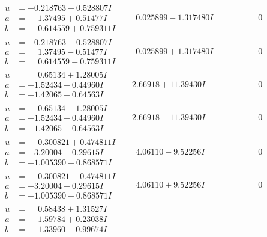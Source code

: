 \documentclass[1p]{elsarticle_modified}
\theoremstyle{definition}
\begin{document}
$$\begin{array}{c|c|c}
\begin{aligned}
u &= -0.218763 + 0.528807 I \\
a &= \phantom{-}1.37495 + 0.51477 I \\
b &= \phantom{-}0.614559 + 0.759311 I\end{aligned}
 & \phantom{-}0.025899 - 1.317480 I & \phantom{-0.000000 } 0 \\ \hline\begin{aligned}
u &= -0.218763 - 0.528807 I \\
a &= \phantom{-}1.37495 - 0.51477 I \\
b &= \phantom{-}0.614559 - 0.759311 I\end{aligned}
 & \phantom{-}0.025899 + 1.317480 I & \phantom{-0.000000 } 0 \\ \hline\begin{aligned}
u &= \phantom{-}0.65134 + 1.28005 I \\
a &= -1.52434 - 0.44960 I \\
b &= -1.42065 + 0.64563 I\end{aligned}
 & -2.66918 + 11.39430 I & \phantom{-0.000000 } 0 \\ \hline\begin{aligned}
u &= \phantom{-}0.65134 - 1.28005 I \\
a &= -1.52434 + 0.44960 I \\
b &= -1.42065 - 0.64563 I\end{aligned}
 & -2.66918 - 11.39430 I & \phantom{-0.000000 } 0 \\ \hline\begin{aligned}
u &= \phantom{-}0.300821 + 0.474811 I \\
a &= -3.20004 + 0.29615 I \\
b &= -1.005390 + 0.868571 I\end{aligned}
 & \phantom{-}4.06110 - 9.52256 I & \phantom{-0.000000 } 0 \\ \hline\begin{aligned}
u &= \phantom{-}0.300821 - 0.474811 I \\
a &= -3.20004 - 0.29615 I \\
b &= -1.005390 - 0.868571 I\end{aligned}
 & \phantom{-}4.06110 + 9.52256 I & \phantom{-0.000000 } 0 \\ \hline\begin{aligned}
u &= \phantom{-}0.58438 + 1.31527 I \\
a &= \phantom{-}1.59784 + 0.23038 I \\
b &= \phantom{-}1.33960 - 0.99674 I\end{aligned}

\end{array}$$
\end{document}
